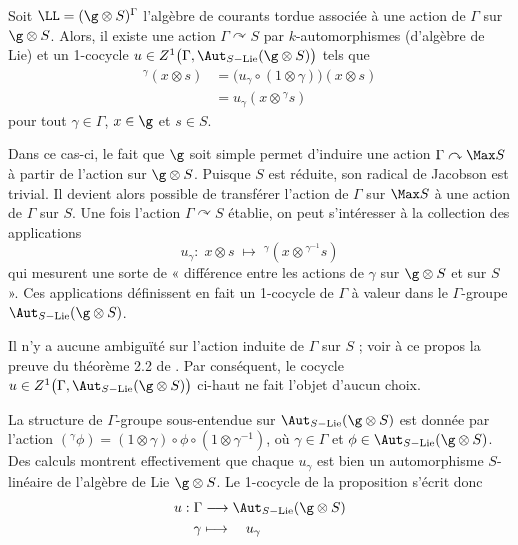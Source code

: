 \begin{Prop} \label{1cocycle} Soit $\LL = (\g \otimes S)^\Gamma$ l'algèbre de courants tordue associée à une action de $\Gamma$ sur $\g \otimes S$. Alors, il existe une action $\Gamma \curvearrowright S$ par $k$-automorphismes (d'algèbre de Lie) et un 1-cocycle $u \in Z^1\big(\Gamma,\Aut_{S-\text{Lie}} (\g \otimes S)\big)$ tels que
\begin{align*}
{}^\gamma(x \otimes s) &= \big(u_\gamma \circ (1 \otimes \gamma)\big)(x \otimes s) \\
&= u_\gamma(x \otimes {}^\gamma s)
\end{align*}
pour tout $\gamma \in \Gamma$, $x \in \g$ et $s \in S$.
\end{Prop}

Dans ce cas-ci, le fait que $\g$ soit simple permet d'induire une action $\Gamma \curvearrowright \Max S$ à partir de l'action sur $\g \otimes S$. Puisque $S$ est réduite, son radical de Jacobson est trivial. Il devient alors possible de transférer l'action de $\Gamma$ sur $\Max S$ à une action de $\Gamma$ sur $S$. Une fois l'action $\Gamma \curvearrowright S$ établie, on peut s'intéresser à la collection des applications
$$u_\gamma : \; x \otimes s \; \longmapsto \; ^\gamma(x \otimes {}^{\gamma^{-1}} s) $$
qui mesurent une sorte de « différence entre les actions de $\gamma$ sur $\g \otimes S$ et sur $S$ ». Ces applications définissent en fait un 1-cocycle de $\Gamma$ à valeur dans le $\Gamma$-groupe $\Aut_{S-\text{Lie}} (\g \otimes S)$. 

\begin{Rem} Il n'y a aucune ambiguïté sur l'action induite de $\Gamma$ sur $S$ ; voir à ce propos la preuve du théorème 2.2 de \cite{LauTCA}. Par conséquent, le cocycle $u \in Z^1\big(\Gamma,\Aut_{S-\text{Lie}} (\g \otimes S)\big)$ ci-haut ne fait l'objet d'aucun choix.
\end{Rem}


La structure de $\Gamma$-groupe sous-entendue sur $\Aut_{S-\text{Lie}} (\g \otimes S)$ est donnée par l'action \linebreak $({}^\gamma \phi) = (1 \otimes \gamma) \circ \phi \circ (1 \otimes \gamma^{-1})$, où $\gamma \in \Gamma$ et $\phi \in \Aut_{S-\text{Lie}} (\g \otimes S)$. Des calculs montrent effectivement que chaque $u_\gamma$ est bien un automorphisme $S$-linéaire de l'algèbre de Lie $\g \otimes S$. Le 1-cocycle de la proposition s'écrit donc
\begin{align*}
u : \; &\Gamma \longrightarrow \Aut_{S-\text{Lie}} (\g \otimes S) \\
&\gamma  \longmapsto \quad u_\gamma
\end{align*}

